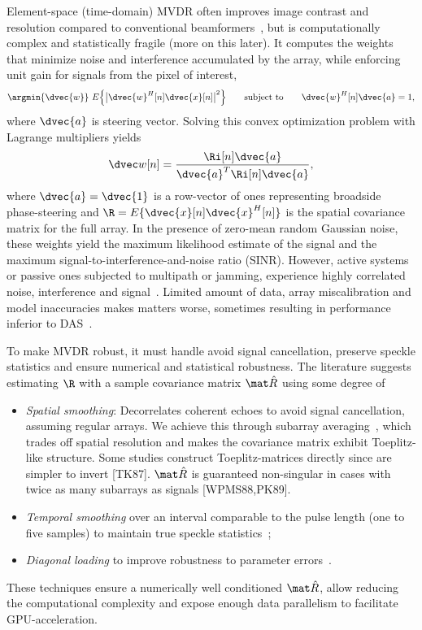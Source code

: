 {Element-space (time-domain) MVDR often improves image contrast and resolution compared to conventional beamformers~\cite{Benitz1997,Synnevag2007,Blomberg2013,Blomberg2012a,Dursun2009,Lo2004}, but is computationally complex and statistically fragile (more on this later). It computes the weights that minimize noise and interference accumulated by the array, while enforcing unit gain for signals from the pixel of interest,
%
\begin{gather}
\argmin{\dvec{w}}\ E\Big\{\big|\dvec{w}^H[n]\dvec{x}[n]\big|^2\Big\} \qquad\text{subject to}\qquad \dvec{w}^H[n]\dvec{a} = 1, \label{2_eq_mvdr_def}
\end{gather}
%
where $\dvec{a}$ is steering vector. Solving this convex optimization problem with Lagrange multipliers yields
%
\begin{gather}
\dvec w[n] = \frac{\Ri[n]\dvec{a}}{\dvec{a}^T\Ri[n]\dvec{a}}, \label{2_eq_weights}
\end{gather}
%
where $\dvec{a}=\dvec{1}$ is a row-vector of ones representing broadside phase-steering and $\R=E\{\dvec{x}[n]\dvec{x}^H[n]\}$ is the spatial covariance matrix for the full array. In the presence of zero-mean random Gaussian noise, these weights yield the maximum likelihood estimate of the signal and the maximum signal-to-interference-and-noise ratio (SINR). However, active systems or passive ones subjected to multipath or jamming, experience highly correlated noise, interference and signal~\cite{Widrow1982}. Limited amount of data, array miscalibration and model inaccuracies makes matters worse, sometimes resulting in performance inferior to DAS~\cite{Li2006robust}. 

To make MVDR robust, it must handle avoid signal cancellation, preserve speckle statistics and ensure numerical and statistical robustness. The literature suggests estimating $\R$ with a sample covariance matrix $\eR$ using some degree of
%
\begin{itemize}
\item \emph{Spatial smoothing}: Decorrelates coherent echoes to avoid signal cancellation, assuming regular arrays. We achieve this through subarray averaging~\cite{Kailath1985}, which trades off spatial resolution and makes the covariance matrix exhibit Toeplitz-like structure. Some studies construct Toeplitz-matrices directly since are simpler to invert [TK87]. $\eR$ is guaranteed non-singular in cases with twice as many subarrays as signals [WPMS88,PK89]. 
\item \emph{Temporal smoothing} over an interval comparable to the pulse length (one to five samples) to maintain true speckle statistics~\cite{Synnevag2009};
\item \emph{Diagonal loading} to improve robustness to parameter errors~\cite{Cox1987,Maksym1979,VanTrees2002}.
\end{itemize}%
%
These techniques ensure a numerically well conditioned $\eR$, allow reducing the computational complexity and expose enough data parallelism to facilitate GPU-acceleration. 


}
